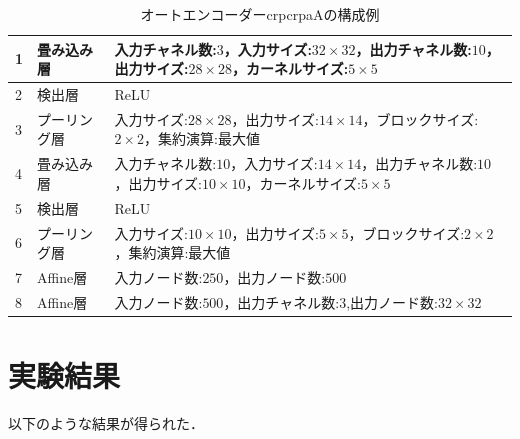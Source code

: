 \documentclass[12pt]{jsarticle}
\begin{document}
\begin{table}[bt]
\begin{center}
\caption{オートエンコーダーcrpcrpaAの構成例}
\label{table:CRPCRPAA}
\begin{tabularx}{0.9\linewidth}{|l|l|X|}
\hline
1 & 畳み込み層 & 入力チャネル数:$3$，入力サイズ:$32 \times 32$，出力チャネル数:$10$，出力サイズ:$28 \times 28$，カーネルサイズ:$5 \times 5$ \\
\hline
2 & 検出層 & ReLU \\
\hline
3 & プーリング層 & 入力サイズ:$28 \times 28$，出力サイズ:$14 \times 14$，ブロックサイズ:$2 \times 2$，集約演算:最大値 \\
\hline
4 & 畳み込み層 & 入力チャネル数:$10$，入力サイズ:$14 \times 14$，出力チャネル数:$10$，出力サイズ:$10 \times 10$，カーネルサイズ:$5 \times 5$ \\
\hline
5 & 検出層 & ReLU \\
\hline
6 & プーリング層 & 入力サイズ:$10 \times 10$，出力サイズ:$5 \times 5$，ブロックサイズ:$2 \times 2$，集約演算:最大値 \\
\hline
7 & Affine層 & 入力ノード数:$250$，出力ノード数:$500$ \\
\hline
8 & Affine層 & 入力ノード数:$500$，出力チャネル数:$3$,出力ノード数:$ 32 \times 32 $ \\
\hline
\end{tabularx}
\end{center}
\end{table}



\clearpage

\section{実験結果}

以下のような結果が得られた．
\end{document}
